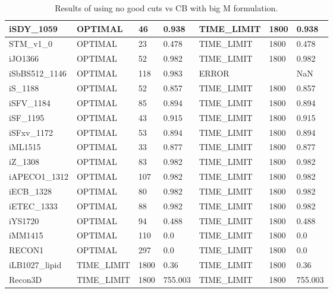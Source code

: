 \begin{table}[!ht]
\begin{tabular}{|l|l|l|l|l|l|l|}
        iSDY\_1059 & OPTIMAL & 46 & 0.938 & TIME\_LIMIT & 1800 & 0.938 \\ \hline
        STM\_v1\_0 & OPTIMAL & 23 & 0.478 & TIME\_LIMIT & 1800 & 0.478 \\ \hline
        iJO1366 & OPTIMAL & 52 & 0.982 & TIME\_LIMIT & 1800 & 0.982 \\ \hline
        iSbBS512\_1146 & OPTIMAL & 118 & 0.983 & ERROR & ~ & NaN \\ \hline
        iS\_1188 & OPTIMAL & 52 & 0.857 & TIME\_LIMIT & 1800 & 0.857 \\ \hline
        iSFV\_1184 & OPTIMAL & 85 & 0.894 & TIME\_LIMIT & 1800 & 0.894 \\ \hline
        iSF\_1195 & OPTIMAL & 43 & 0.915 & TIME\_LIMIT & 1800 & 0.915 \\ \hline
        iSFxv\_1172 & OPTIMAL & 53 & 0.894 & TIME\_LIMIT & 1800 & 0.894 \\ \hline
        iML1515 & OPTIMAL & 33 & 0.877 & TIME\_LIMIT & 1800 & 0.877 \\ \hline
        iZ\_1308 & OPTIMAL & 83 & 0.982 & TIME\_LIMIT & 1800 & 0.982 \\ \hline
        iAPECO1\_1312 & OPTIMAL & 107 & 0.982 & TIME\_LIMIT & 1800 & 0.982 \\ \hline
        iECB\_1328 & OPTIMAL & 80 & 0.982 & TIME\_LIMIT & 1800 & 0.982 \\ \hline
        iETEC\_1333 & OPTIMAL & 88 & 0.982 & TIME\_LIMIT & 1800 & 0.982 \\ \hline
        iYS1720 & OPTIMAL & 94 & 0.488 & TIME\_LIMIT & 1800 & 0.488 \\ \hline
        iMM1415 & OPTIMAL & 110 & 0.0 & TIME\_LIMIT & 1800 & 0.0 \\ \hline
        RECON1 & OPTIMAL & 297 & 0.0 & TIME\_LIMIT & 1800 & 0.0 \\ \hline
        iLB1027\_lipid & TIME\_LIMIT & 1800 & 0.36 & TIME\_LIMIT & 1800 & 0.36 \\ \hline
        Recon3D & TIME\_LIMIT & 1800 & 755.003 & TIME\_LIMIT & 1800 & 755.003 \\ \hline
    \end{tabular}
    \caption{\label{Tab:cb_vs_ngc_big_m} Results of using no good cuts vs CB with big M formulation.}
\end{table}


